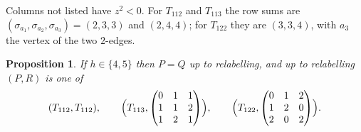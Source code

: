 \documentclass[11pt,a4paper]{amsart}
\newtheorem{proposition}[theorem]{Proposition}
\theoremstyle{definition}
\theoremstyle{remark}
\begin{document}
\noindent
Columns not listed have $z^2<0$. For $T_{112}$ and $T_{113}$ the row sums are $(\sigma_{a_1},\sigma_{a_2},\sigma_{a_3})=(2,3,3)$
and $(2,4,4)$; for $T_{122}$ they are $(3,3,4)$, with $a_3$ the vertex of the two $2$-edges.

\begin{proposition}\label{prop:h45}
If $h\in\{4,5\}$ then $P=Q$ up to relabelling, and up to relabelling $(P,R)$ is one of
\[
(T_{112},T_{112}),\qquad \Bigl(T_{113},\begin{pmatrix}0&1&1\\1&1&2\\1&2&1\end{pmatrix}\Bigr),\qquad
\Bigl(T_{122},\begin{pmatrix}0&1&2\\1&2&0\\2&0&2\end{pmatrix}\Bigr).
\]
\end{proposition}
\end{document}

